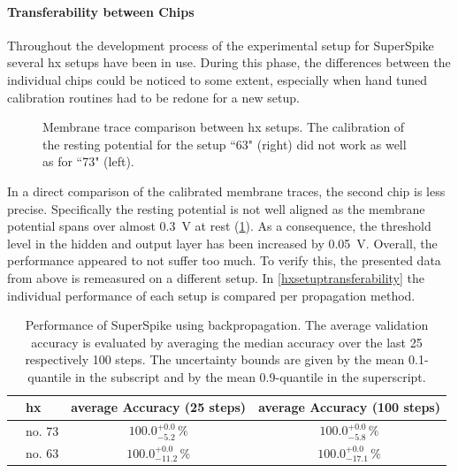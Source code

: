 \paragraph{Transferability between Chips}
Throughout the development process of the experimental setup for SuperSpike several \gls{hx} setups have been in use. During this phase, the differences between the individual chips could be noticed to some extent, especially when hand tuned calibration routines had to be redone for a new setup.
\begin{figure}[b!]
	\begin{subfigure}{0.5\textwidth}
		\centering
		
	\end{subfigure}
	\begin{subfigure}{0.5\textwidth}
		\centering
		
	\end{subfigure}
	\caption[Membrane trace comparison between \gls{hx} setups.]{Membrane trace comparison between \gls{hx} setups. The calibration of the resting potential for the setup ``63" (right) did not work as well as for ``73" (left).}
	\label{hxsetupmemtracescomparison}
\end{figure}
In a direct comparison of the calibrated membrane traces, the second chip is less precise. Specifically the resting potential is not well aligned as the membrane potential spans over almost \SI{0.3}{\V} at rest (\cref{hxsetupmemtracescomparison}). As a consequence, the threshold level in the hidden and output layer has been increased by \SI{0.05}{V}. Overall, the performance appeared to not suffer too much. To verify this, the presented data from above is remeasured on a different setup. In \cref{hxsetuptransferability} the individual performance of each setup is compared per propagation method. 

\begin{table}[t!]\centering{}
	\begin{tabular}{@{}rlcc@{}}\toprule
		& \gls{hx}& average Accuracy (25 steps)	 & 	average Accuracy (100 steps) \\ \midrule
		& no. 73			& 	 $100.0_{-5.2}^{+0.0}\,\%$ & 	$100.0_{-5.8}^{+0.0}\, \%$\\
		& no. 63			&	$100.0_{-11.2}^{+0.0}\,\%$ &   $100.0_{-17.1}^{+0.0}\, \%$\\
		\bottomrule
	\end{tabular}
	\caption[Performance of SuperSpike using backpropagation.]{Performance of SuperSpike using backpropagation. The average validation accuracy is evaluated by averaging the median accuracy over the last 25 respectively 100 steps. The uncertainty bounds are given by the mean 0.1-quantile in the subscript and by the mean 0.9-quantile in the superscript.}
	\label{backpropresults}
\end{table}

